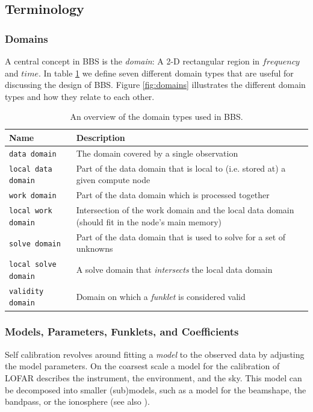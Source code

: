 \documentclass[10pt]{lofar}
\newcommand{\bbs}{BBS\xspace}
\newcommand{\lofar}{LOFAR\xspace}
\begin{document}
\subsection{Terminology}
\label{subsec:terminology}

\subsubsection{Domains}
\label{subsubsec:domains}
A central concept in \bbs is the \emph{domain}: A 2-D rectangular region in
$frequency$ and $time$. In table \ref{tab:domains} we define seven different
domain types that are useful for discussing the design of \bbs. Figure
\ref{fig:domains} illustrates the different domain types and how they relate to
each other.

\begin{table}[htb!]
\centering
\begin{tabular}{lp{}}
\hline
\textbf{Name} & \textbf{Description}\\
\hline
\texttt{data domain} & The domain covered by a single observation\\
\hline
\texttt{local data domain} & Part of the data domain that is local to (i.e.
stored at) a given compute node\\
\hline
\texttt{work domain} & Part of the data domain which is processed together\\
\hline
\texttt{local work domain} & Intersection of the work domain and the local data
domain (should fit in the node's main memory)\\
\hline
\texttt{solve domain} & Part of the data domain that is used to solve for a set
of unknowns\\
\hline
\texttt{local solve domain} & A solve domain that \emph{intersects} the local
data domain\\
\hline
\texttt{validity domain} & Domain on which a \emph{funklet} is considered
valid\\
\end{tabular}
\caption{An overview of the domain types used in \bbs.}
\label{tab:domains}
\end{table}

\subsubsection{Models, Parameters, Funklets, and Coefficients} 
\label{subsubsec:models-parameters-funklets-coefficients}

Self calibration revolves around fitting a \emph{model} to the observed data by
adjusting the model parameters. On the coarsest scale a model for the
calibration of \lofar describes the instrument, the environment, and the sky.
This model can be decomposed into smaller (sub)models, such as a model for the
beamshape, the bandpass, or the ionosphere (see also
\cite[sec.2]{LOFAR-ASTRON-SDD-050}).
\end{document}

